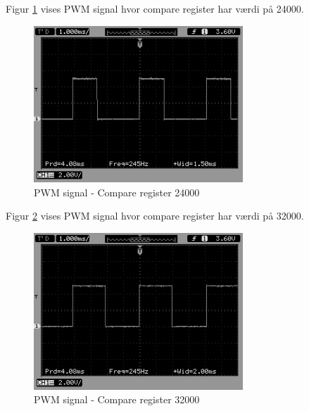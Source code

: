 \newpage

Figur \ref{fig:PWM_2} vises PWM signal hvor compare register har værdi på 24000. 
\begin{figure}[H]
\centering
\includegraphics[width=0.7\textwidth]{Billeder/Test/PWM_24000.png}

\caption{PWM signal - Compare register 24000}
\label{fig:PWM_2}
\end{figure}

\vspace{0.5cm}

Figur \ref{fig:PWM_3} vises PWM signal hvor compare register har værdi på 32000. 
\begin{figure}[H]
\centering
\includegraphics[width=0.7\textwidth]{Billeder/Test/PWM_32000.png}
\vspace{-0.0cm}
\caption{PWM signal - Compare register 32000}
\label{fig:PWM_3}
\end{figure}
